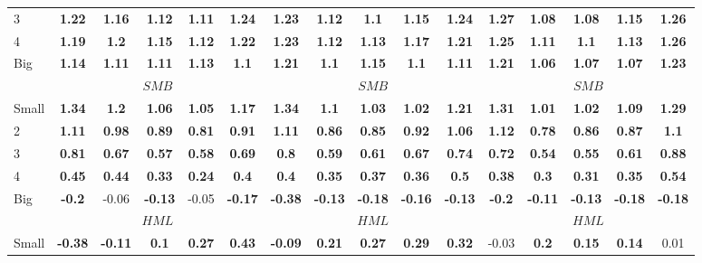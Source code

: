 \begin{table}[H]
\begin{tabular}{lccccc|ccccc|ccccc}
3 & \textbf{1.22} & \textbf{1.16} & \textbf{1.12} & \textbf{1.11} & \textbf{1.24} & \textbf{1.23} & \textbf{1.12} & \textbf{1.1} & \textbf{1.15} & \textbf{1.24} & \textbf{1.27} & \textbf{1.08} & \textbf{1.08} & \textbf{1.15} & \textbf{1.26} \\
4 & \textbf{1.19} & \textbf{1.2} & \textbf{1.15} & \textbf{1.12} & \textbf{1.22} & \textbf{1.23} & \textbf{1.12} & \textbf{1.13} & \textbf{1.17} & \textbf{1.21} & \textbf{1.25} & \textbf{1.11} & \textbf{1.1} & \textbf{1.13} & \textbf{1.26} \\
Big & \textbf{1.14} & \textbf{1.11} & \textbf{1.11} & \textbf{1.13} & \textbf{1.1} & \textbf{1.21} & \textbf{1.1} & \textbf{1.15} & \textbf{1.1} & \textbf{1.11} & \textbf{1.21} & \textbf{1.06} & \textbf{1.07} & \textbf{1.07} & \textbf{1.23} \\
 & \multicolumn{5}{c|}{$SMB$} & \multicolumn{5}{c|}{$SMB$} & \multicolumn{5}{c}{$SMB$} \\
Small & \textbf{1.34} & \textbf{1.2} & \textbf{1.06} & \textbf{1.05} & \textbf{1.17} & \textbf{1.34} & \textbf{1.1} & \textbf{1.03} & \textbf{1.02} & \textbf{1.21} & \textbf{1.31} & \textbf{1.01} & \textbf{1.02} & \textbf{1.09} & \textbf{1.29} \\
2 & \textbf{1.11} & \textbf{0.98} & \textbf{0.89} & \textbf{0.81} & \textbf{0.91} & \textbf{1.11} & \textbf{0.86} & \textbf{0.85} & \textbf{0.92} & \textbf{1.06} & \textbf{1.12} & \textbf{0.78} & \textbf{0.86} & \textbf{0.87} & \textbf{1.1} \\
3 & \textbf{0.81} & \textbf{0.67} & \textbf{0.57} & \textbf{0.58} & \textbf{0.69} & \textbf{0.8} & \textbf{0.59} & \textbf{0.61} & \textbf{0.67} & \textbf{0.74} & \textbf{0.72} & \textbf{0.54} & \textbf{0.55} & \textbf{0.61} & \textbf{0.88} \\
4 & \textbf{0.45} & \textbf{0.44} & \textbf{0.33} & \textbf{0.24} & \textbf{0.4} & \textbf{0.4} & \textbf{0.35} & \textbf{0.37} & \textbf{0.36} & \textbf{0.5} & \textbf{0.38} & \textbf{0.3} & \textbf{0.31} & \textbf{0.35} & \textbf{0.54} \\
Big & \textbf{-0.2} & -0.06 & \textbf{-0.13} & -0.05 & \textbf{-0.17} & \textbf{-0.38} & \textbf{-0.13} & \textbf{-0.18} & \textbf{-0.16} & \textbf{-0.13} & \textbf{-0.2} & \textbf{-0.11} & \textbf{-0.13} & \textbf{-0.18} & \textbf{-0.18} \\
 & \multicolumn{5}{c|}{$HML$} & \multicolumn{5}{c|}{$HML$} & \multicolumn{5}{c}{$HML$} \\
Small & \textbf{-0.38} & \textbf{-0.11} & \textbf{0.1} & \textbf{0.27} & \textbf{0.43} & \textbf{-0.09} & \textbf{0.21} & \textbf{0.27} & \textbf{0.29} & \textbf{0.32} & -0.03 & \textbf{0.2} & \textbf{0.15} & \textbf{0.14} & 0.01 \\

\end{tabular}
\end{table}
